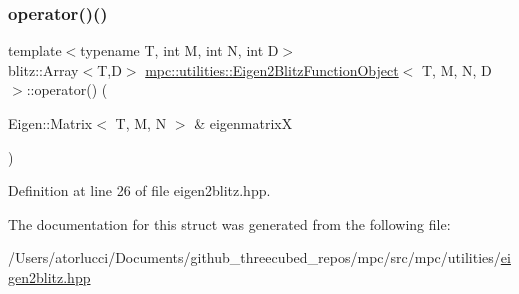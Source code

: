 \subsubsection{\texorpdfstring{operator()()}{operator()()}}
{\footnotesize\ttfamily template$<$typename T, int M, int N, int D$>$ \\
blitz\+::\+Array$<$T,D$>$ \mbox{\hyperlink{structmpc_1_1utilities_1_1_eigen2_blitz_function_object}{mpc\+::utilities\+::\+Eigen2\+Blitz\+Function\+Object}}$<$ T, M, N, D $>$\+::operator() (\begin{DoxyParamCaption}\item[{Eigen\+::\+Matrix$<$ T, M, N $>$ \&}]{eigenmatrixX }\end{DoxyParamCaption})\hspace{0.3cm}{\ttfamily [inline]}}



Definition at line 26 of file eigen2blitz.\+hpp.



The documentation for this struct was generated from the following file\+:\begin{DoxyCompactItemize}
\item 
/\+Users/atorlucci/\+Documents/github\+\_\+threecubed\+\_\+repos/mpc/src/mpc/utilities/\mbox{\hyperlink{eigen2blitz_8hpp}{eigen2blitz.\+hpp}}\end{DoxyCompactItemize}
